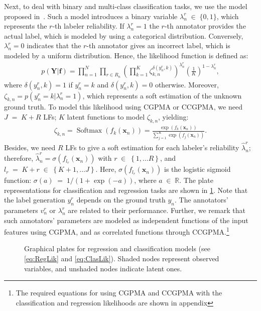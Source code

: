 \documentclass[journal]{IEEEtran}
\providecommand{\ve}[1]{{\bm{#1}}}%
\providecommand{\mat}[1]{{\bm{#1}}} %
\newcommand{\Real}{\mathbb{R}}
\DeclareMathOperator{\en}{\!\,\in\!\,}
\DeclareMathOperator{\igual}{\!\,=\!\,}
\providecommand{\ve}[1]{{\mathbf{#1}}}
\providecommand{\mat}[1]{{\mathbf{#1}}}
\begin{document}
Next, to deal with binary and multi-class classification tasks, we use the model proposed in~\cite{rodrigues2013learning}. Such a model introduces a binary variable $\lambda_n^r\en \{0,1\}$, which represents the $r$-th labeler reliability. If $\lambda_n^r=1$ the $r$-th annotator provides the actual label, which is modeled by using a categorical distribution. Conversely, $\lambda_n^r=0$ indicates that the $r$-th annotator gives an incorrect label, which is modeled by a uniform distribution. Hence, the likelihood function is defined as:
\begin{align}
\label{eq:ClasLik}
p(\mat{Y}|{\ve{f}}) = \prod^N_{n=1}\prod_{r\in R_n}\left(\prod_{k=1}^{K}\zeta_{k,n}^{\delta(y_n^r,k)}\right)^{\lambda_n^r}\left(\frac{1}{K}\right)^{1-\lambda_n^r},
\end{align}
where $\delta(y_n^r,k)=1$ if $y_n^r=k$ and $\delta(y_n^r,k)=0$ otherwise. Moreover, $\zeta_{k,n}=p(y_n^r=k|\lambda_n^r=1)$, which represents a soft estimation of the unknown ground truth. To model this likelihood using CGPMA or CCGPMA, we need $J\igual K+R$ LFs; $K$ latent functions to model $\zeta_{k,n}$, yielding:
\begin{align}
\zeta_{k,n} =\operatorname{Softmax}(f_k(\ve{x}_n))= \frac{\exp(f_k(\ve{x}_n))}{\sum_{j=1}^{K}\exp(f_j(\ve{x}_n))}.
\end{align}
Besides, we need $R$ LFs to give a soft estimation for each labeler's reliability $\hat{\lambda}_n^r$; therefore, $\hat{\lambda}_n^r=\sigma(f_{l_r}(\ve{x}_n))$ with $r\en \left\{1, \dots R\right\}$, and $l_r \igual K+r \en \left\{K+1, \dots J\right\}$. Here, $\sigma(f_{l_r}(\ve{x}_n))$ is the logistic sigmoid function: $\sigma(a)\igual{1}/{(1+\exp(-a))}$, where $a\en\Real.$  The plate representations for classification and regression tasks are shown in \cref{fig:GM}. Note that the label generation $y_n^r$ depends on the ground truth $y_n$. The annotators' parameters $v_n^r$ or $\lambda_n^r$ are related to their performance. Further, we remark that such annotators' parameters are modeled as independent functions of the input features using CGPMA, and as correlated functions through CCGPMA.\footnote{The required equations for using CGPMA and CCGPMA with the classification and regression likelihoods are shown in appendix}
\begin{figure}[tb!]
	\centering
	\hspace{0.5cm}
	\caption{Graphical plates for regression and classification models (see \cref{eq:RegLik} and \cref{eq:ClasLik}). Shaded nodes represent observed variables, and unshaded nodes indicate latent ones.}
	\label{fig:GM}
\end{figure}
\end{document}
